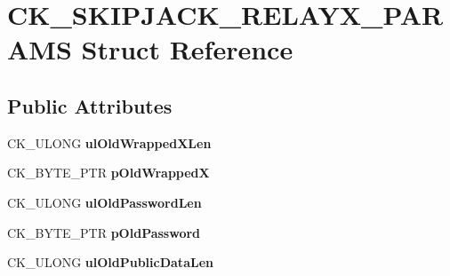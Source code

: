 \hypertarget{struct_c_k___s_k_i_p_j_a_c_k___r_e_l_a_y_x___p_a_r_a_m_s}{}\section{C\+K\+\_\+\+S\+K\+I\+P\+J\+A\+C\+K\+\_\+\+R\+E\+L\+A\+Y\+X\+\_\+\+P\+A\+R\+A\+MS Struct Reference}
\label{struct_c_k___s_k_i_p_j_a_c_k___r_e_l_a_y_x___p_a_r_a_m_s}
\subsection*{Public Attributes}
\begin{DoxyCompactItemize}
\item 
\mbox{\label{struct_c_k___s_k_i_p_j_a_c_k___r_e_l_a_y_x___p_a_r_a_m_s_a5afba8d5dbb475b957e729888903362b}} 
C\+K\+\_\+\+U\+L\+O\+NG {\bfseries ul\+Old\+Wrapped\+X\+Len}
\item 
\mbox{\label{struct_c_k___s_k_i_p_j_a_c_k___r_e_l_a_y_x___p_a_r_a_m_s_a9cef5e7ec9335c08b91b988fc6f05acf}} 
C\+K\+\_\+\+B\+Y\+T\+E\+\_\+\+P\+TR {\bfseries p\+Old\+WrappedX}
\item 
\mbox{\label{struct_c_k___s_k_i_p_j_a_c_k___r_e_l_a_y_x___p_a_r_a_m_s_a597654379260ca437a21699c14f6ff8b}} 
C\+K\+\_\+\+U\+L\+O\+NG {\bfseries ul\+Old\+Password\+Len}
\item 
\mbox{\label{struct_c_k___s_k_i_p_j_a_c_k___r_e_l_a_y_x___p_a_r_a_m_s_af16e984cc4e961be8590c4f76fea05d9}} 
C\+K\+\_\+\+B\+Y\+T\+E\+\_\+\+P\+TR {\bfseries p\+Old\+Password}
\item 
\mbox{\label{struct_c_k___s_k_i_p_j_a_c_k___r_e_l_a_y_x___p_a_r_a_m_s_a2f88cefe5de5235d36198c3c1eb5703d}} 
C\+K\+\_\+\+U\+L\+O\+NG {\bfseries ul\+Old\+Public\+Data\+Len}
\item 
\mbox{\label{struct_c_k___s_k_i_p_j_a_c_k___r_e_l_a_y_x___p_a_r_a_m_s_a52c76bf36051d8f71284258220238224}} 

\end{DoxyCompactItemize}
